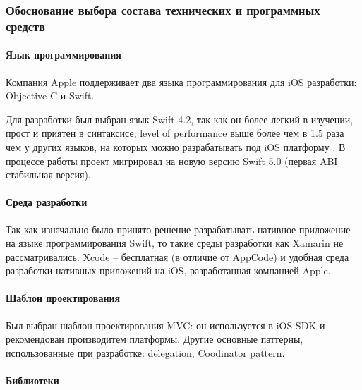 \documentclass[a4paper,12pt]{article}
\begin{document}
	\subsubsection{Обоснование выбора состава технических и программных средств}
	\paragraph{Язык программирования\\}
	Компания Apple поддерживает два языка программирования для iOS разработки: Objective-C и Swift. 
	
	Для разработки был выбран язык Swift 4.2, так как он более легкий в изучении, прост и приятен в синтаксисе, level of performance выше более чем в 1.5 раза чем у других языков, на которых можно разрабатывать под iOS платформу \cite{whySwift}. В процессе работы проект мигрировал на новую версию Swift 5.0 (первая ABI стабильная версия).
	\paragraph{Среда разработки\\}
	Так как изначально было принято решение разрабатывать нативное приложение на языке программирования Swift, то такие среды разработки как Xamarin не рассматривались. Xcode -- бесплатная (в отличие от AppCode) и удобная среда разработки  нативных приложений на iOS, разработанная компанией Apple.
	
	\paragraph{Шаблон проектирования\\}
	
	Был выбран шаблон проектирования MVC: он используется в iOS SDK и рекомендован производитем платформы. Другие основные паттерны, использованные при разработке: delegation, Coodinator pattern.
	\paragraph{Библиотеки}
	
\end{document}
